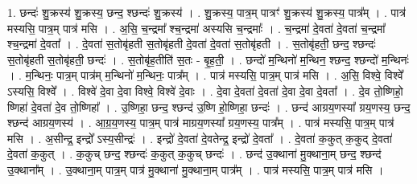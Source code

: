 \documentclass[17pt]{extarticle}
\begin{document}
1. छन्दः॑ शु॒क्रस्य॑ शु॒क्रस्य॒ छन्द॒ श्छन्दः॑ शु॒क्रस्य॑ । . शु॒क्रस्य॒ पात्र॒म् पात्रꣳ॑ शु॒क्रस्य॑ शु॒क्रस्य॒ पात्र᳚म् । . पात्र॑ मस्यसि॒ पात्र॒म् पात्र॑ मसि । . अ॒सि॒ च॒न्द्रमा᳚ श्च॒न्द्रमा॑ अस्यसि च॒न्द्रमाः᳚ । . च॒न्द्रमा॑ दे॒वता॑ दे॒वता॑ च॒न्द्रमा᳚ श्च॒न्द्रमा॑ दे॒वता᳚ । . दे॒वता॑ स॒तोबृ॑हती स॒तोबृ॑हती दे॒वता॑ दे॒वता॑ स॒तोबृ॑हती । . स॒तोबृ॑हती॒ छन्द॒ श्छन्दः॑ स॒तोबृ॑हती स॒तोबृ॑हती॒ छन्दः॑ । . स॒तोबृ॑ह॒तीति॑ स॒तः - बृ॒ह॒ती॒ । . छन्दो॑ म॒न्थिनो॑ म॒न्थिन॒ श्छन्द॒ श्छन्दो॑ म॒न्थिनः॑ । . म॒न्थिनः॒ पात्र॒म् पात्र॑म् म॒न्थिनो॑ म॒न्थिनः॒ पात्र᳚म् । . पात्र॑ मस्यसि॒ पात्र॒म् पात्र॑ मसि । . अ॒सि॒ विश्वे॒ विश्वे᳚ ऽस्यसि॒ विश्वे᳚ । . विश्वे॑ दे॒वा दे॒वा विश्वे॒ विश्वे॑ दे॒वाः । . दे॒वा दे॒वता॑ दे॒वता॑ दे॒वा दे॒वा दे॒वता᳚ । . दे॒व तो॒ष्णिहो॒ ष्णिहा॑ दे॒वता॑ दे॒व तो॒ष्णिहा᳚ । . उ॒ष्णिहा॒ छन्द॒ श्छन्द॑ उ॒ष्णि हो॒ष्णिहा॒ छन्दः॑ । . छन्द॑ आग्रय॒णस्या᳚ ग्रय॒णस्य॒ छन्द॒ श्छन्द॑ आग्रय॒णस्य॑ । . आ॒ग्र॒य॒णस्य॒ पात्र॒म् पात्र॑ माग्रय॒णस्या᳚ ग्रय॒णस्य॒ पात्र᳚म् । . पात्र॑ मस्यसि॒ पात्र॒म् पात्र॑ मसि । . अ॒सीन्द्र॒ इन्द्रो᳚ ऽस्य॒सीन्द्रः॑ । . इन्द्रो॑ दे॒वता॑ दे॒वतेन्द्र॒ इन्द्रो॑ दे॒वता᳚ । . दे॒वता॑ क॒कुत् क॒कुद् दे॒वता॑ दे॒वता॑ क॒कुत् । . क॒कुच् छन्द॒ श्छन्दः॑ क॒कुत् क॒कुच् छन्दः॑ । . छन्द॑ उ॒क्थाना॑ मु॒क्थाना॒म् छन्द॒ श्छन्द॑ उ॒क्थाना᳚म् । . उ॒क्थाना॒म् पात्र॒म् पात्र॑ मु॒क्थाना॑ मु॒क्थाना॒म् पात्र᳚म् । . पात्र॑ मस्यसि॒ पात्र॒म् पात्र॑ मसि । \newline
\end{document}
